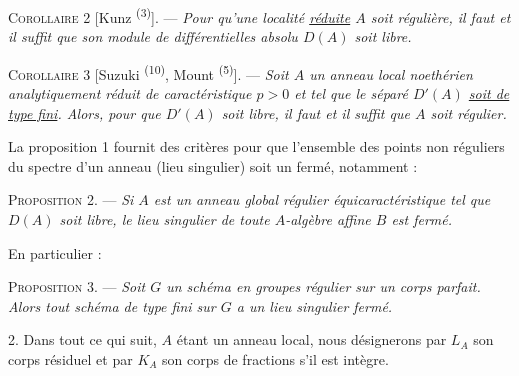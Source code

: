 \textsc{Corollaire 2} [Kunz \textsuperscript{(3)}]. --- \textit{Pour qu'une localité \uline{réduite} $A$ soit régulière, il faut et il suffit que son module de différentielles absolu $D(A)$ soit libre.}

\textsc{Corollaire 3} [Suzuki \textsuperscript{(10)}, Mount \textsuperscript{(5)}]. --- \textit{Soit $A$ un anneau local noethérien analytiquement réduit de caractéristique $p>0$ et tel que le séparé $D'(A)$ \uline{soit de type fini}. Alors, pour que $D'(A)$ soit libre, il faut et il suffit que $A$ soit régulier.}

La proposition 1 fournit des critères pour que l'ensemble des points non réguliers du spectre d'un anneau (lieu singulier) soit un fermé, notamment :

\textsc{Proposition 2.} --- \textit{Si $A$ est un anneau global régulier équicaractéristique tel que $D(A)$ soit libre, le lieu singulier de toute $A$-algèbre affine $B$ est fermé.}

En particulier :

\textsc{Proposition 3.} --- \textit{Soit $G$ un schéma en groupes régulier sur un corps parfait. Alors tout schéma de type fini sur $G$ a un lieu singulier fermé.}

2. Dans tout ce qui suit, $A$ étant un anneau local, nous désignerons par $L_A$ son corps résiduel et par $K_A$ son corps de fractions s'il est intègre.

